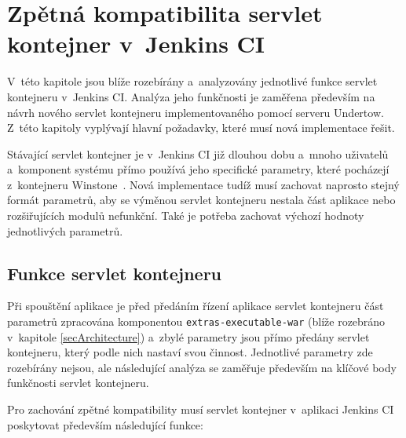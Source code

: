  


    \section{Zpětná kompatibilita servlet kontejner v~Jenkins CI}   \label{secKompatibilita}
        V~této kapitole jsou blíže rozebírány a~analyzovány jednotlivé funkce servlet
        kontejneru v~Jenkins CI. Analýza jeho funkčnosti je zaměřena především na 
        návrh nového servlet kontejneru implementovaného pomocí serveru Undertow.
        Z~této kapitoly vyplývají hlavní požadavky, které musí nová implementace
        řešit.

        Stávající servlet kontejner je v~Jenkins CI již dlouhou dobu
        a~mnoho uživatelů a~komponent systému přímo používá jeho specifické
        parametry, které pocházejí z~kontejneru Winstone~\cite{kohsukeTopic}. Nová implementace
        tudíž musí zachovat naprosto stejný formát parametrů, aby 
        se výměnou servlet kontejneru nestala část aplikace nebo rozšiřujících modulů nefunkční.
        Také je potřeba zachovat výchozí hodnoty jednotlivých parametrů.

        \subsection{Funkce servlet kontejneru} \label{kapFunkcionality}
            Při spouštění aplikace je před předáním řízení aplikace servlet kontejneru
            část parametrů zpracována komponentou \texttt{extras-executable-war} (blíže 
            rozebráno v~kapitole \ref{secArchitecture}) a~zbylé parametry jsou přímo
            předány servlet kontejneru, který podle nich nastaví svou činnost.
            Jednotlivé parametry zde rozebírány nejsou, ale následující analýza
            se zaměřuje především na klíčové body funkčnosti servlet kontejneru.

            \newpage
            Pro zachování zpětné kompatibility musí servlet kontejner v~aplikaci 
            Jenkins CI poskytovat především následující funkce:
            
